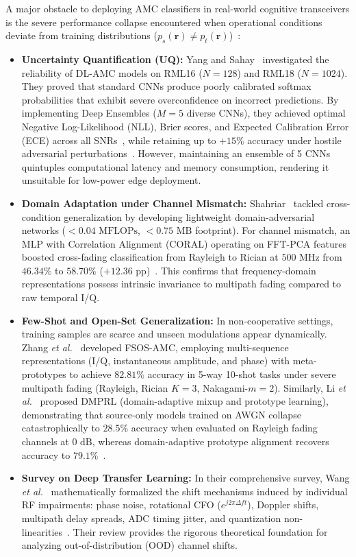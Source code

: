 A major obstacle to deploying AMC classifiers in real-world cognitive transceivers is the severe performance collapse encountered when operational conditions deviate from training distributions ($p_s(\mathbf{r}) \ne p_t(\mathbf{r})$)~\cite{wang2025survey}:
\begin{itemize}
    \item \textbf{Uncertainty Quantification (UQ):} Yang and Sahay~\cite{yang2026uncertainty} investigated the reliability of DL-AMC models on RML16 ($N=128$) and RML18 ($N=1024$). They proved that standard CNNs produce poorly calibrated softmax probabilities that exhibit severe overconfidence on incorrect predictions. By implementing Deep Ensembles ($M=5$ diverse CNNs), they achieved optimal Negative Log-Likelihood (NLL), Brier scores, and Expected Calibration Error (ECE) across all SNRs~\cite[Fig.~2,~7]{yang2026uncertainty}, while retaining up to $+15\%$ accuracy under hostile adversarial perturbations~\cite[Fig.~8]{yang2026uncertainty}. However, maintaining an ensemble of 5 CNNs quintuples computational latency and memory consumption, rendering it unsuitable for low-power edge deployment.
    \item \textbf{Domain Adaptation under Channel Mismatch:} Shahriar~\cite{shahriar2026lightweight} tackled cross-condition generalization by developing lightweight domain-adversarial networks ($<0.04\text{ MFLOPs}$, $<0.75\text{ MB}$ footprint). For channel mismatch, an MLP with Correlation Alignment (CORAL) operating on FFT-PCA features boosted cross-fading classification from Rayleigh to Rician at $500\text{ MHz}$ from $46.34\%$ to $58.70\%$ ($+12.36\text{ pp}$)~\cite[Table~II]{shahriar2026lightweight}. This confirms that frequency-domain representations possess intrinsic invariance to multipath fading compared to raw temporal I/Q.
    \item \textbf{Few-Shot and Open-Set Generalization:} In non-cooperative settings, training samples are scarce and unseen modulations appear dynamically. Zhang \emph{et al.}~\cite{zhang2025fsos} developed FSOS-AMC, employing multi-sequence representations (I/Q, instantaneous amplitude, and phase) with meta-prototypes to achieve $82.81\%$ accuracy in 5-way 10-shot tasks under severe multipath fading (Rayleigh, Rician $K=3$, Nakagami-$m=2$). Similarly, Li \emph{et al.}~\cite{li2026openset} proposed DMPRL (domain-adaptive mixup and prototype learning), demonstrating that source-only models trained on AWGN collapse catastrophically to $28.5\%$ accuracy when evaluated on Rayleigh fading channels at $0\text{ dB}$, whereas domain-adaptive prototype alignment recovers accuracy to $79.1\%$~\cite[Table~I]{li2026openset}.
    \item \textbf{Survey on Deep Transfer Learning:} In their comprehensive survey, Wang \emph{et al.}~\cite{wang2025survey} mathematically formalized the shift mechanisms induced by individual RF impairments: phase noise, rotational CFO ($e^{j2\pi\Delta f t}$), Doppler shifts, multipath delay spreads, ADC timing jitter, and quantization non-linearities~\cite[Table~III]{wang2025survey}. Their review provides the rigorous theoretical foundation for analyzing out-of-distribution (OOD) channel shifts.
\end{itemize}


